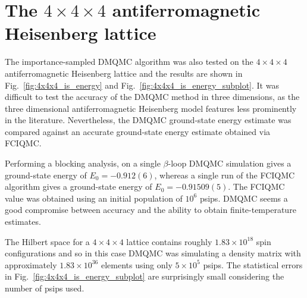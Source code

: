 \section{The $4\times4\times4$ antiferromagnetic Heisenberg lattice}
The importance-sampled DMQMC algorithm was also tested on the $4\times4\times4$ antiferromagnetic Heisenberg lattice and the results are shown in Fig.~\ref{fig:4x4x4_is_energy} and Fig.~\ref{fig:4x4x4_is_energy_subplot}. It was difficult to test the accuracy of the DMQMC method in three dimensions, as the three dimensional antiferromagnetic Heisenberg model features less prominently in the literature. Nevertheless, the DMQMC ground-state energy estimate was compared against an accurate ground-state energy estimate obtained via FCIQMC\cite{SpencerFCIQMC}. 

Performing a blocking analysis, on a single $\beta$-loop DMQMC simulation gives a ground-state energy of $E_0 = -0.912(6)$, whereas a single run of the FCIQMC algorithm\cite{SpencerFCIQMC} gives a ground-state energy of $E_0 = -0.91509(5)$. The FCIQMC value was obtained using an initial population of $10^6$ psips. DMQMC seems a good compromise between accuracy and the ability to obtain finite-temperature estimates.

The Hilbert space for a $4 \times 4 \times 4$ lattice contains roughly $1.83\times10^{18}$ spin configurations and so in this case DMQMC was simulating a density matrix with approximately $1.83\times10^{36}$ elements using only $5\times10^5$ psips. The statistical errors in Fig.~\ref{fig:4x4x4_is_energy_subplot} are surprisingly small considering the number of psips used.


